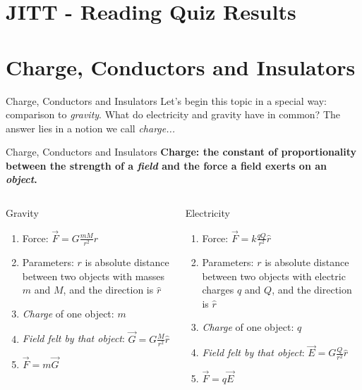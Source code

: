 \documentclass{beamer}
\begin{document}
\section{JITT - Reading Quiz Results}

\section{Charge, Conductors and Insulators}

\begin{frame}{Charge, Conductors and Insulators}
Let's begin this topic in a special way: comparison to \textit{gravity}.  What do electricity and gravity have in common?  The answer lies in a notion we call \textit{charge...}
\end{frame}

\begin{frame}{Charge, Conductors and Insulators}
\centering
\textbf{\alert{Charge: the constant of proportionality between the strength of a \textit{field} and the force a field exerts on an \textit{object}.}} \\
\hrulefill
\small
\begin{columns}[T]
\begin{column}{0.5\textwidth}
\alert{Gravity}
\begin{enumerate}
\item Force: $\vec{F} = G \frac{m M}{r^2} \hat{r}$
\item Parameters: $r$ is absolute distance between two objects with masses $m$ and $M$, and the direction is $\hat{r}$
\item \textit{Charge} of one object: $m$
\item \textit{Field felt by that object}: $\vec{G} = G \frac{M}{r^2} \hat{r}$
\item $\vec{F} = m \vec{G}$
\end{enumerate}
\end{column}
\begin{column}{0.5\textwidth}
\alert{Electricity}
\begin{enumerate}
\item Force: $\vec{F} = k \frac{q Q}{r^2} \hat{r}$
\item Parameters: $r$ is absolute distance between two objects with electric charges $q$ and $Q$, and the direction is $\hat{r}$
\item \textit{Charge} of one object: $q$
\item \textit{Field felt by that object}: $\vec{E} = G \frac{Q}{r^2} \hat{r}$
\item $\vec{F} = q \vec{E}$
\end{enumerate}
\end{column}
\end{columns}
\end{frame}
\end{document}
